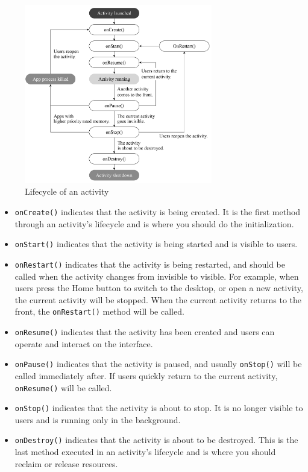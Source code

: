 \documentclass[a4paper,12pt,openany]{book}
\begin{document}
\begin{figure}[ht]
    \centering
    \includegraphics[width=0.73\textwidth]{D10Z/10-3}
    \caption{Lifecycle of an activity}
\end{figure}

\begin{itemize}
    \item \verb|onCreate()| indicates that the activity is being created. It is the first method through an activity’s lifecycle and is where you should do the initialization.
    \item \verb|onStart()| indicates that the activity is being started and is visible to users.
    \item \verb|onRestart()| indicates that the activity is being restarted, and should be called when the activity changes from invisible to visible. For example, when users press the Home button to switch to the desktop, or open a new activity, the current activity will be stopped. When the current activity returns to the front, the \verb|onRestart()| method will be called.
    \item \verb|onResume()| indicates that the activity has been created and users can operate and interact on the interface.
    \item \verb|onPause()| indicates that the activity is paused, and usually \verb|onStop()| will be called immediately after. If users quickly return to the current activity, \verb|onResume()| will be called.
    \item \verb|onStop()| indicates that the activity is about to stop. It is no longer visible to users and is running only in the background.
    \item \verb|onDestroy()| indicates that the activity is about to be destroyed. This is the last method executed in an activity’s lifecycle and is where you should reclaim or release resources.
\end{itemize}
\end{document}
